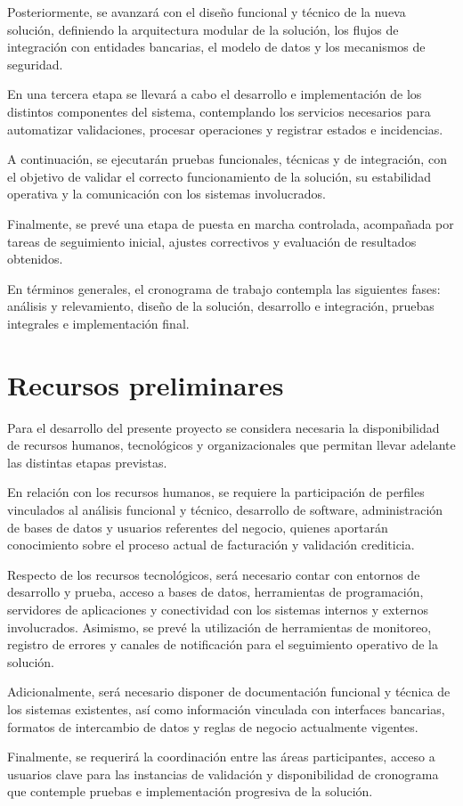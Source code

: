 Posteriormente, se avanzará con el diseño funcional y técnico de la nueva solución, definiendo la arquitectura modular de la solución, los flujos de integración con entidades bancarias, el modelo de datos y los mecanismos de seguridad.

En una tercera etapa se llevará a cabo el desarrollo e implementación de los distintos componentes del sistema, contemplando los servicios necesarios para automatizar validaciones, procesar operaciones y registrar estados e incidencias.

A continuación, se ejecutarán pruebas funcionales, técnicas y de integración, con el objetivo de validar el correcto funcionamiento de la solución, su estabilidad operativa y la comunicación con los sistemas involucrados.

Finalmente, se prevé una etapa de puesta en marcha controlada, acompañada por tareas de seguimiento inicial, ajustes correctivos y evaluación de resultados obtenidos.

En términos generales, el cronograma de trabajo contempla las siguientes fases: análisis y relevamiento, diseño de la solución, desarrollo e integración, pruebas integrales e implementación final.

\section{Recursos preliminares}

Para el desarrollo del presente proyecto se considera necesaria la disponibilidad de recursos humanos, tecnológicos y organizacionales que permitan llevar adelante las distintas etapas previstas.

En relación con los recursos humanos, se requiere la participación de perfiles vinculados al análisis funcional y técnico, desarrollo de software, administración de bases de datos y usuarios referentes del negocio, quienes aportarán conocimiento sobre el proceso actual de facturación y validación crediticia.

Respecto de los recursos tecnológicos, será necesario contar con entornos de desarrollo y prueba, acceso a bases de datos, herramientas de programación, servidores de aplicaciones y conectividad con los sistemas internos y externos involucrados. Asimismo, se prevé la utilización de herramientas de monitoreo, registro de errores y canales de notificación para el seguimiento operativo de la solución.

Adicionalmente, será necesario disponer de documentación funcional y técnica de los sistemas existentes, así como información vinculada con interfaces bancarias, formatos de intercambio de datos y reglas de negocio actualmente vigentes.

Finalmente, se requerirá la coordinación entre las áreas participantes, acceso a usuarios clave para las instancias de validación y disponibilidad de cronograma que contemple pruebas e implementación progresiva de la solución.
